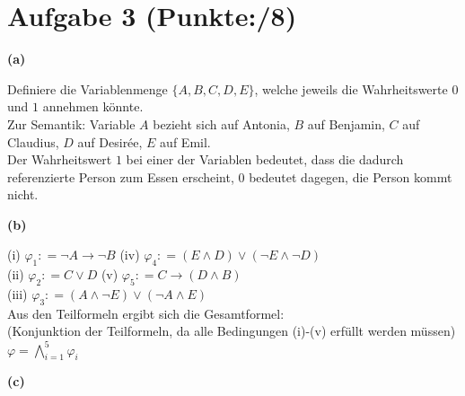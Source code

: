 \documentclass[11pt, a4paper]{article}
\newcommand{\p}{8}
\newcommand{\defgr}{\mathrel{\mathop:\!\!=}}
\begin{document}
\section*{Aufgabe 3 (Punkte:\qquad/\p)}
\textbf{(a)}
\begin{adjustwidth}{20pt}{20pt}
Definiere die Variablenmenge $\{A,B,C,D,E \}$, welche jeweils die Wahrheitswerte $0$ und $1$ annehmen könnte.\\

Zur Semantik: Variable $A$ bezieht sich auf Antonia, $B$ auf Benjamin, $C$ auf Claudius, $D$ auf Desir\'{e}e, $E$ auf Emil.\\
Der Wahrheitswert $1$ bei einer der Variablen bedeutet, dass die dadurch referenzierte Person zum Essen erscheint, $0$ bedeutet dagegen, die Person kommt nicht.
\end{adjustwidth}
\textbf{(b)}
\begin{adjustwidth}{20pt}{20pt}
(i) $\varphi_1 \defgr \neg A \rightarrow  \neg B$ \hspace*{60pt} (iv) $\varphi_4 \defgr (E\wedge D)\vee(\neg E\wedge \neg D)$\\
(ii) $\varphi_2\defgr C \vee D$ \hspace*{78pt}  (v) $\varphi_5 \defgr C \rightarrow (D\wedge B)$\\
(iii) $\varphi_3\defgr (A\wedge\neg E)\vee(\neg A \wedge E)$\\

Aus den Teilformeln ergibt sich die Gesamtformel:\\
(Konjunktion der Teilformeln, da alle Bedingungen (i)-(v) erfüllt werden müssen)\\

$\varphi=\bigwedge\limits_{i=1}^5 \varphi_i$
\end{adjustwidth}
\textbf{(c)}
\end{document}
